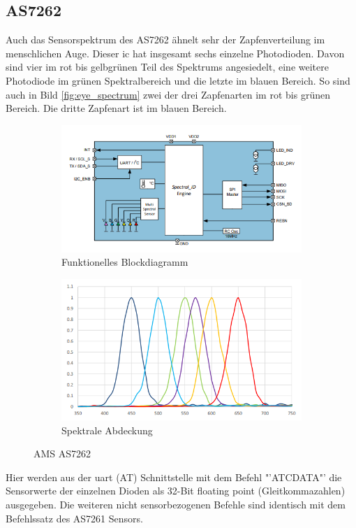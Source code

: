 \documentclass[11pt]{scrartcl}
\begin{document}
\subsection{AS7262}
Auch das Sensorspektrum des AS7262 ähnelt sehr der Zapfenverteilung im menschlichen Auge. Dieser \ac{ic} hat insgesamt sechs einzelne
Photodioden. Davon sind vier im rot bis gelbgrünen Teil des Spektrums angesiedelt, eine weitere Photodiode im grünen Spektralbereich und
die letzte im blauen Bereich. So sind auch in Bild \ref{fig:eye_spectrum} zwei der drei Zapfenarten im rot bis grünen Bereich. Die dritte
Zapfenart ist im blauen Bereich.
\begin{figure}[H]
    \centering
    \begin{subfigure}[b]{0.49\textwidth}
        \includegraphics[width=\textwidth]{images/AS7262_functional_blockdiagram.png}
        \caption{Funktionelles Blockdiagramm}
    \end{subfigure}
    \hfill 
    \begin{subfigure}[b]{0.49\textwidth}
        \includegraphics[width=\textwidth]{images/AS7262_spectrum.png}
        \caption{Spektrale Abdeckung}\label{fig:spec_7262}
    \end{subfigure}
    \caption[AMS AS7262]{AMS AS7262 \cite{datasheet62}}\label{fig:AS7262}
\end{figure}
\noindent
Hier werden aus der \ac{uart} (AT) Schnittstelle mit dem Befehl "'ATCDATA"' die Sensorwerte der einzelnen Dioden als 32-Bit floating point
(Gleitkommazahlen) ausgegeben. Die weiteren nicht sensorbezogenen Befehle sind identisch mit dem Befehlssatz des AS7261 Sensors.
\clearpage
\end{document}
